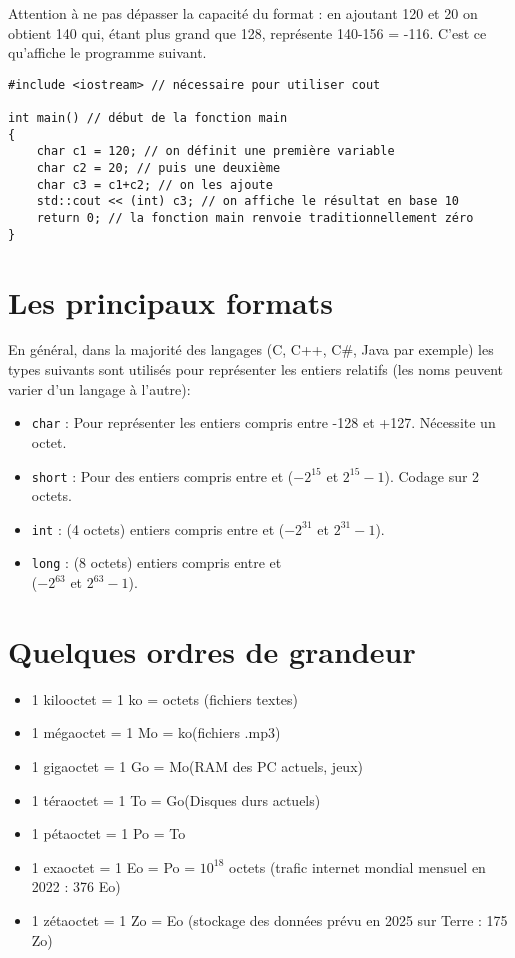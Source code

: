 Attention à ne pas dépasser la capacité du format : en ajoutant 120 et 20 on obtient 140 qui, étant plus grand que 128, représente 140-156 = -116. C'est ce qu'affiche le programme suivant.
\begin{verbatim}
#include <iostream> // nécessaire pour utiliser cout

int main() // début de la fonction main
{
    char c1 = 120; // on définit une première variable
    char c2 = 20; // puis une deuxième
    char c3 = c1+c2; // on les ajoute
    std::cout << (int) c3; // on affiche le résultat en base 10
    return 0; // la fonction main renvoie traditionnellement zéro
}
\end{verbatim}

\section{Les principaux formats}

En général, dans la majorité des langages (C, C++, C\#, Java par exemple)  les types suivants
sont utilisés pour représenter les entiers relatifs (les noms peuvent varier d'un langage à l'autre):
\begin{itemize}
    \item  \texttt{char} :  Pour représenter les entiers compris entre -128 et +127. Nécessite un octet.
    \item  \texttt{short} :  Pour des entiers compris entre  et  ($-2^{15}$ et $2^{15}-1$). Codage sur 2
          octets.
    \item  \texttt{int} :  (4 octets) entiers compris entre  et  ($-2^{31}$ et $2^{31}-1$).
    \item  \texttt{long} : (8 octets) entiers compris entre  et\\  ($-2^{63}$ et
          $2^{63}-1$).
\end{itemize}

\section{Quelques ordres de grandeur}
\begin{itemize}
    \item   1 kilooctet = 1 ko =   octets (fichiers textes)
    \item   1 mégaoctet = 1 Mo =  ko(fichiers .mp3)
    \item   1 gigaoctet = 1 Go =  Mo(RAM des PC actuels, jeux)
    \item   1 téraoctet = 1 To =  Go(Disques durs actuels)
    \item   1 pétaoctet = 1 Po =  To
    \item   1 exaoctet = 1 Eo =  Po = $10^{18}$ octets (trafic internet mondial mensuel en 2022 : 376 Eo)
    \item   1 zétaoctet = 1 Zo =  Eo (stockage des données prévu en 2025 sur Terre : 175 Zo)
\end{itemize}

